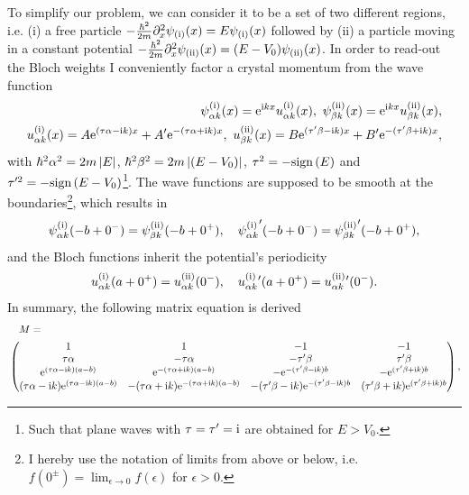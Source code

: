 To simplify our problem, we can consider it to be a set of two different regions, i.e. (i) a free particle $-\frac{\hbar^2}{2m}\partial_x^2\psi_{\rm (i)}(x) = E\psi_{\rm (i)}(x)$ followed by (ii) a particle moving in a constant potential $-\frac{\hbar^2}{2m}\partial_x^2\psi_{\rm (ii)}(x) = (E-V_0)\psi_{\rm (ii)}(x)$.
In order to read-out the Bloch weights I conveniently factor a crystal momentum from the wave function
\begin{align}
    \psi_{\alpha k}^{\rm (i)}(x) = \mathrm e^{\mathrm i kx}u_{\alpha k}^{\rm (i)}(x),
    \
    \psi_{\beta k}^{\rm (ii)}(x) = \mathrm e^{\mathrm i kx}u_{\beta k}^{\rm (ii)}(x),
    \\
    u_{\alpha k}^{\rm (i)}(x) = A\mathrm e^{(\tau\alpha-\mathrm i k) x} + A'\mathrm e^{-(\tau\alpha+\mathrm i k) x},
    \
    u_{\beta k}^{\rm (ii)}(x) = B\mathrm e^{(\tau'\beta-\mathrm i k) x} + B'\mathrm e^{-(\tau'\beta+\mathrm i k) x},
\end{align}
with $\hbar^2\alpha^2 = 2m\left| E \right|$, $\hbar^2\beta^2 = 2m\left| (E-V_0) \right|$, $\tau^2=-\text{sign}\left( E \right)$ and $\tau'^2=-\text{sign}\left( E-V_0 \right)$\footnote{Such that plane waves with $\tau=\tau'=\mathrm i$ are obtained for $E>V_0$.}.
The wave functions are supposed to be smooth at the boundaries\footnote{I hereby use the notation of limits from above or below, i.e. $f(0^\pm)=\lim_{\epsilon\rightarrow0}f(\epsilon)$ for $\epsilon>0$.}, which results in
\begin{align}
    \psi_{\alpha k}^{\rm (i)}(-b+0^-)=\psi_{\beta k}^{\rm (ii)}(-b+0^+),
    \quad
    {\psi_{\alpha k}^{\rm (i)}}'(-b+0^-)={\psi_{\beta k}^{\rm (ii)}}'(-b+0^+),
\end{align}
and the Bloch functions inherit the potential's periodicity
\begin{align}
    u_{\alpha k}^{\rm (i)}(a+0^+) = u_{\alpha k}^{\rm (ii)}(0^-),
    \quad
    u_{\alpha k}^{\rm (i)}{}'(a+0^+) = u_{\alpha k}^{\rm (ii)}{}'(0^-).
\end{align}
In summary, the following matrix equation is derived
\begin{align}
    &\quad M = \nonumber\\
    &\begin{pmatrix}
        1 & 1 & -1 & -1\\
        \tau\alpha & -\tau\alpha & -\tau'\beta & \tau'\beta\\
        \mathrm e^{(\tau \alpha-\mathrm i k)(a-b)}  & \mathrm e^{-(\tau \alpha+\mathrm i k) (a-b)} &
        -\mathrm e^{-(\tau'\beta -\mathrm i k)b}     & -\mathrm e^{ (\tau'\beta+\mathrm i k)b} \\
        (\tau \alpha-\mathrm i k)\mathrm e^{(\tau \alpha-\mathrm i k)(a-b)}  & -(\tau \alpha+\mathrm i k)\mathrm e^{-(\tau \alpha+\mathrm i k) (a-b)} &
        -(\tau'\beta -\mathrm i k)\mathrm e^{-(\tau'\beta -\mathrm i k)b}     & (\tau'\beta+\mathrm i k)\mathrm e^{ (\tau'\beta+\mathrm i k)b} \\
    \end{pmatrix},
\end{align}
